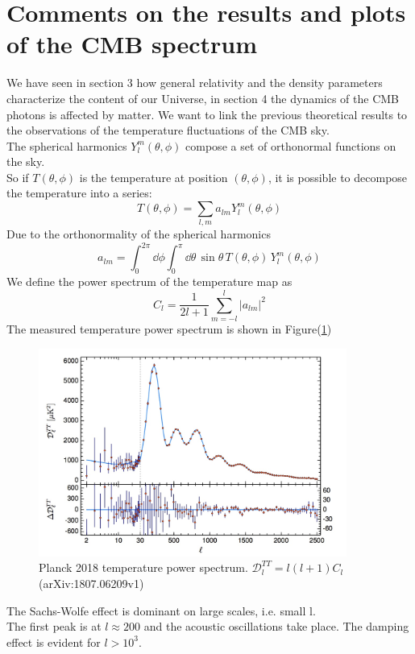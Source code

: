 \documentclass{article}
\begin{document}
\section{Comments on the results and plots of the CMB spectrum}
We have seen in section 3 how general relativity and the density parameters  characterize the content of our Universe,  in section 4 the dynamics of the CMB photons is affected by matter.
We want to link the previous theoretical results to the observations of the temperature fluctuations of the CMB sky.\\
The spherical harmonics $Y^{m} _{l} (\theta, \phi)$ compose a set of orthonormal functions on the sky.\\
So if $T(\theta,\phi)$ is the temperature at position $(\theta,\phi)$, it is possible to decompose the temperature into a series:
\begin{equation}
T(\theta, \phi) = \sum _{l, m} a_{lm} Y^{m} _l (\theta, \phi)
\end{equation}
Due to the orthonormality of the spherical harmonics
\begin{equation}
a_{lm} = \int _0 ^{2 \pi} \dd \phi \int _0  ^{\pi} \dd \theta \,
\sin \theta \, T(\theta, \phi) \, Y^{m} _l (\theta, \phi)
 \end{equation}
 We define the power spectrum of the temperature map as 
 \begin{equation}
 C_l = \dfrac{1}{2l+1} \sum _{m=-l} ^{l} |a_{lm}|^2
 \end{equation}
The measured temperature power spectrum is shown in Figure(\ref{temp_pow_spect})
%
%
%
\begin{figure}
\includegraphics[width=0.9\textwidth]{planck2018}
\caption{Planck 2018 temperature power spectrum. $\mathcal{D}^{TT}_l = l(l+1)C_l$ (arXiv:1807.06209v1)}
\label{temp_pow_spect}
\end{figure}
%
%
%
The Sachs-Wolfe effect is dominant on large scales, i.e. small l.\\
The first peak is at $l \approx 200$ and the  acoustic oscillations take place.
The damping effect is evident for $l>10^{3}$.\\
\end{document}
